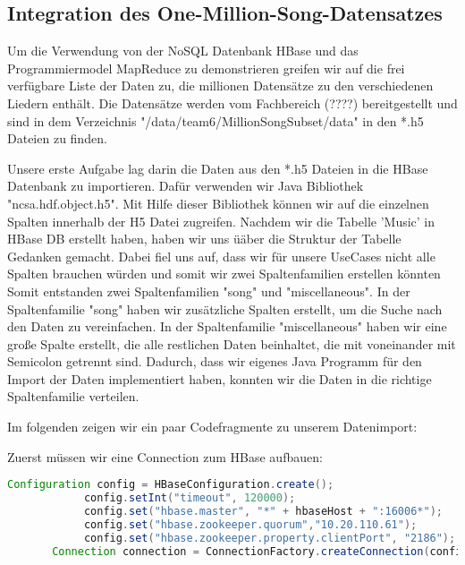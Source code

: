 \subsection{Integration des One-Million-Song-Datensatzes}
Um die Verwendung von der NoSQL Datenbank HBase und das Programmiermodel MapReduce zu demonstrieren greifen wir auf die frei verfügbare Liste der Daten zu, die millionen Datensätze zu den verschiedenen Liedern enthält. Die Datensätze werden vom Fachbereich (????) bereitgestellt und sind in dem Verzeichnis "/data/team6/MillionSongSubset/data" in den *.h5 Dateien zu finden. 

Unsere erste Aufgabe lag darin die Daten aus den *.h5 Dateien in die HBase Datenbank zu importieren.
Dafür verwenden wir Java Bibliothek "ncsa.hdf.object.h5". Mit Hilfe dieser Bibliothek können wir auf die einzelnen Spalten innerhalb der H5 Datei zugreifen.
Nachdem wir die Tabelle 'Music' in HBase DB erstellt haben, haben wir uns üäber die Struktur der Tabelle Gedanken gemacht. Dabei fiel uns auf, dass wir für unsere UseCases nicht alle Spalten brauchen würden und somit wir zwei Spaltenfamilien erstellen könnten Somit entstanden zwei Spaltenfamilien "song" und "miscellaneous". In der Spaltenfamilie "song" haben wir zusätzliche Spalten erstellt, um die Suche nach den Daten zu vereinfachen. In der Spaltenfamilie "miscellaneous" haben wir eine große Spalte erstellt, die alle restlichen Daten beinhaltet, die mit voneinander mit Semicolon getrennt sind.
Dadurch, dass wir eigenes Java Programm für den Import der Daten implementiert haben, konnten wir die Daten in die richtige Spaltenfamilie verteilen.

Im folgenden zeigen wir ein paar Codefragmente zu unserem Datenimport:

Zuerst müssen wir eine Connection zum HBase aufbauen:



\begin{lstlisting}[language=Java]
Configuration config = HBaseConfiguration.create();
            config.setInt("timeout", 120000);
            config.set("hbase.master", "*" + hbaseHost + ":16006*");
            config.set("hbase.zookeeper.quorum","10.20.110.61");
            config.set("hbase.zookeeper.property.clientPort", "2186");
	   Connection connection = ConnectionFactory.createConnection(config);
\end{lstlisting}

